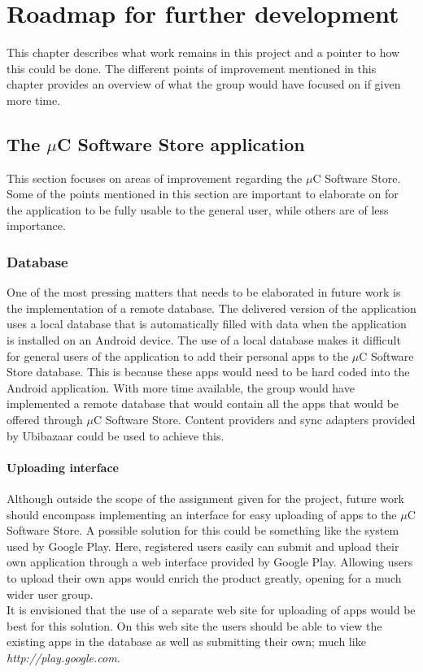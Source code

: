 \chapter{Roadmap for further development}
This chapter describes what work remains in this project and a pointer to how this could be done. The different points of improvement mentioned in this chapter provides an overview of what the group would have focused on if given more time.

\section{The $\mu$C Software Store application}
This section focuses on areas of improvement regarding the $\mu$C Software Store. Some of the points mentioned in this section are important to elaborate on for the application to be fully usable to the general user, while others are of less importance.

	\subsection{Database}
	One of the most pressing matters that needs to be elaborated in future work is the implementation of a remote database. The delivered version of the application uses a local database that is automatically filled with data when the application is installed on an Android device. The use of a local database makes it difficult for general users of the application to add their personal apps to the $\mu$C Software Store database. This is because these apps would need to be hard coded into the Android application. With more time available, the group would have implemented a remote database that would contain all the apps that would be offered through $\mu$C Software Store. Content providers and sync adapters provided by Ubibazaar could be used to achieve this.

	\subsubsection{Uploading interface}
	Although outside the scope of the assignment given for the project, future work should encompass implementing an interface for easy uploading of apps to the $\mu$C Software Store. A possible solution for this could be something like the system used by Google Play. Here, registered users easily can submit and upload their own application through a web interface provided by Google Play. Allowing users to upload their own apps would enrich the product greatly, opening for a much wider user group.\\
	\newline
	It is envisioned that the use of a separate web site for uploading of apps would be best for this solution. On this web site the users should be able to view the existing apps in the database as well as submitting their own; much like \textit{http://play.google.com}.

